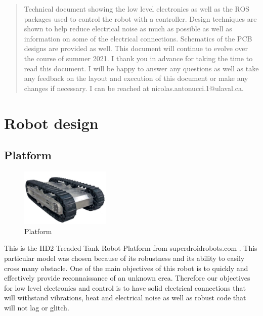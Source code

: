 \documentclass[12pt,letterpaper,oneside]{article}
\begin{document}

\makeCustomTitle
\thispagestyle{titlePage}

\begin{abstract}
Technical document showing the low level electronics as well as the ROS packages used to control the robot with a controller. Design techniques are shown to help reduce electrical noise as much as possible as well as information on some of the electrical connections. Schematics of the PCB designs are provided as well. This document will continue to evolve over the course of summer 2021. I thank you in advance for taking the time to read this document. I will be happy to answer any questions as well as take any feedback on the layout and execution of this document or make any changes if necessary. I can be reached at nicolas.antonucci.1@ulaval.ca.
\end{abstract}


\tableofcontents
\listoffigures

\newpage
\section{Robot design}

\subsection{Platform}

\begin{figure}
  \begin{center}
    \includegraphics[width=0.38\textwidth]{figures/platform.jpg}
  \end{center}
  \caption{Platform}
\end{figure}

This is the HD2 Treaded Tank Robot Platform from superdroidrobots.com \cite{superdroidrobots}. This particular model was chosen because of its robustness and its ability to easily cross many obstacle. One of the main objectives of this robot is to quickly and effectively provide reconnaissance of an unknown erea. Therefore our objectives for low level electronics and control is to have solid electrical connections that will withstand vibrations, heat and electrical noise as well as robust code that will not lag or glitch.\\
\end{document}
